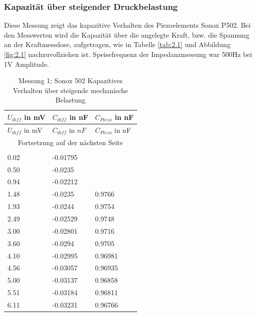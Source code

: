 \documentclass[12pt]{scrreprt} %
\begin{document}
\subsubsection{Kapazität über steigender Druckbelastung}
Diese Messung zeigt das kapazitive Verhalten des Piezoelements Sonox P502. Bei den Messwerten wird die Kapazität über die angelegte Kraft, bzw. die Spannung an der Kraftmessdose, aufgetragen, wie in Tabelle \vref{tab:2.1} und Abbildung \vref{fig:2.1} nachzuvollziehen ist. Speisefrequenz der Impedanzmessung war 500Hz bei 1V Amplitude.
\setlongtables
\begin{longtable}{| l | l | l |}
\hline
$U_{diff}$ in mV&$C_{diff}$ in nF&$C_{Piezo}$ in nF\\
\hline
\endfirsthead
\hline
$U_{diff}$ in mV&$C_{diff}$ in $nF$&$C_{Piezo}$ in nF\\
\hline
\endhead
\hline
\multicolumn{3}{|c|}{Fortsetzung auf der nächsten Seite}\\
\hline
\endfoot
\hline \hline
\caption[Messung 1; Sonox 502 Kapazitives Verhalten]{Messung 1; Sonox 502 Kapazitives Verhalten über steigende mechanische Belastung}\\
\endlastfoot
\hline
\label{tab:2.1}%
0.02&-0.01795&\\
0.50&-0.0235&\\
0.94&-0.02212&\\
1.48&-0.0235&0.9766\\
1.93&-0.0244&0.9754\\
2.49&-0.02529&0.9748\\
3.00&-0.02801&0.9716\\
3.60&-0.0294&0.9705\\
4.10&-0.02995&0.96981\\
4.56&-0.03057&0.96935\\
5.00&-0.03137&0.96858\\
5.51&-0.03184&0.96811\\
6.11&-0.03231&0.96766\\
\end{longtable}
\end{document}
